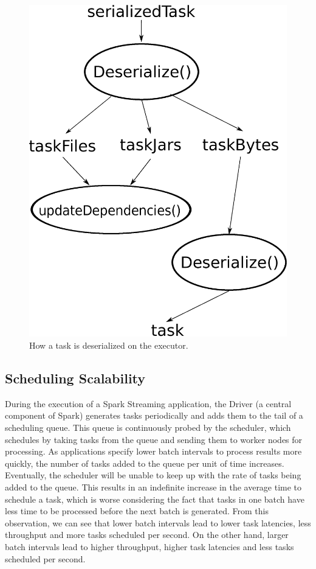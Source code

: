 \begin{figure}[t!]
  \begin{center}
    \includegraphics[scale=0.30]{deserialization.eps}
  \end{center}
  \caption{How a task is deserialized on the executor.}
  \label{fig:deserialization}
\end{figure}

\subsection{Scheduling Scalability}

During the execution of a Spark Streaming application, the Driver (a central component of Spark) generates tasks periodically and adds them to the tail of a scheduling queue. This queue is continuously probed by the scheduler, which schedules by taking tasks from the queue and sending them to worker nodes for processing.
As applications specify lower batch intervals to process results more quickly, the number of tasks added to the queue per unit of time increases. Eventually, the scheduler will be unable to keep up with the rate of tasks being added to the queue. This results in an indefinite increase in the average time to schedule a task, which is worse considering the fact that tasks in one batch have less time to be processed before the next batch is generated.
From this observation, we can see that lower batch intervals lead to lower task latencies, less throughput and more tasks scheduled per second. On the other hand, larger batch intervals lead to higher throughput, higher task latencies and less tasks scheduled per second. 

